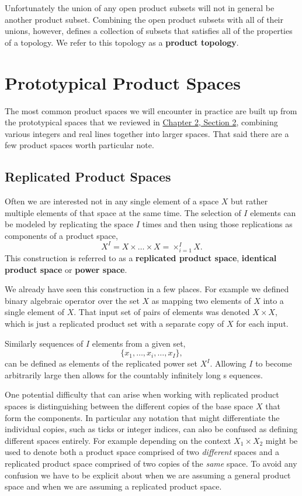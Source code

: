 \documentclass[
  letterpaper,
  DIV=11,
  numbers=noendperiod]{scrartcl}
\begin{document}
Unfortunately the union of any open product subsets will not in general
be another product subset. Combining the open product subsets with all
of their unions, however, defines a collection of subsets that satisfies
all of the properties of a topology. We refer to this topology as a
\textbf{product topology}.

\hypertarget{prototypical-product-spaces}{%
\section{Prototypical Product
Spaces}\label{prototypical-product-spaces}}

The most common product spaces we will encounter in practice are built
up from the prototypical spaces that we reviewed in
\href{@sec:proto-spaces}{Chapter 2, Section 2}, combining various
integers and real lines together into larger spaces. That said there are
a few product spaces worth particular note.

\hypertarget{replicated-product-spaces}{%
\subsection{Replicated Product Spaces}\label{replicated-product-spaces}}

Often we are interested not in any single element of a space \(X\) but
rather multiple elements of that space at the same time. The selection
of \(I\) elements can be modeled by replicating the space \(I\) times
and then using those replications as components of a product space, \[
X^{I} = X \times \ldots \times X = \times_{i = 1}^{I} X.
\] This construction is referred to as a \textbf{replicated product
space}, \textbf{identical product space} or \textbf{power space}.

We already have seen this construction in a few places. For example we
defined binary algebraic operator over the set \(X\) as mapping two
elements of \(X\) into a single element of \(X\). That input set of
pairs of elements was denoted \(X \times X\), which is just a replicated
product set with a separate copy of \(X\) for each input.

Similarly sequences of \(I\) elements from a given set, \[
\{ x_{1}, \ldots, x_{i}, \ldots, x_{I} \},
\] can be defined as elements of the replicated power set \(X^{I}\).
Allowing \(I\) to become arbitrarily large then allows for the countably
infinitely long s equences.

One potential difficulty that can arise when working with replicated
product spaces is distinguishing between the different copies of the
base space \(X\) that form the components. In particular any notation
that might differentiate the individual copies, such as ticks or integer
indices, can also be confused as defining different spaces entirely. For
example depending on the context \(X_{1} \times X_{2}\) might be used to
denote both a product space comprised of two \emph{different} spaces and
a replicated product space comprised of two copies of the \emph{same}
space. To avoid any confusion we have to be explicit about when we are
assuming a general product space and when we are assuming a replicated
product space.
\end{document}
